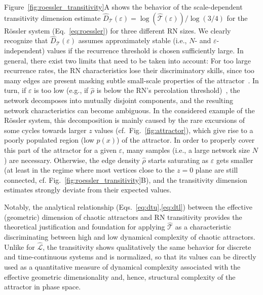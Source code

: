 \documentclass[graybox]{svmult}
\begin{document}
Figure~\ref{fig:roessler_transitivity}A shows the behavior of the scale-dependent transitivity dimension estimate $\hat{D}_{\mathcal{T}}(\varepsilon)=\log(\hat{\mathcal{T}}(\varepsilon))/\log(3/4)$ for the R\"ossler system (Eq.~\ref{eq:roessler}) for three different RN sizes. We clearly recognize that $\hat{D}_{\mathcal{T}}(\varepsilon)$ assumes approximately stable (i.e., $N$- and $\varepsilon$-independent) values if the recurrence threshold is chosen sufficiently large. In general, there exist two limits that need to be taken into account: For too large recurrence rates, the RN characteristics lose their discriminatory skills, since too many edges are present masking subtle small-scale properties of the attractor~\cite{Donges2012PRE,Donner2010PRE}. In turn, if $\varepsilon$ is too low (e.g., if $\hat{\rho}$ is below the RN's percolation threshold)~\cite{Donges2012PRE}, the network decomposes into mutually disjoint components, and the resulting network characteristics can become ambiguous. In the considered example of the R\"ossler system, this decomposition is mainly caused by the rare excursions of some cycles towards larger $z$ values (cf.~Fig.~\ref{fig:attractor}), which give rise to a poorly populated region (low $p(x)$) of the attractor. In order to properly cover this part of the attractor for a given $\varepsilon$, many samples (i.e., a large network size $N$) are necessary. Otherwise, the edge density $\hat{\rho}$ starts saturating as $\varepsilon$ gets smaller (at least in the regime where most vertices close to the $z=0$ plane are still connected, cf. Fig.~\ref{fig:roessler_transitivity}B), and the transitivity dimension estimates strongly deviate from their expected values.

Notably, the analytical relationship (Eqs.~\ref{eq:dtu},\ref{eq:dtl}) between the effective (geometric) dimension of chaotic attractors and RN transitivity provides the theoretical justification and foundation for applying $\hat{\mathcal{T}}$ as a characteristic discriminating between high and low dynamical complexity of chaotic attractors. Unlike for $\hat{\mathcal{L}}$, the transitivity shows qualitatively the same behavior for discrete and time-continuous systems and is normalized, so that its values can be directly used as a quantitative measure of dynamical complexity associated with the effective geometric dimensionality and, hence, structural complexity of the attractor in phase space.

\end{document}
